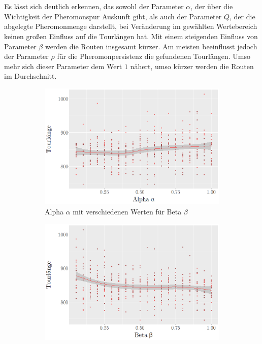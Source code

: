 \documentclass[doktyp=barbeit, sprache=german]{TUBAFarbeiten}
\begin{document}
\\\\Es lässt sich deutlich erkennen, das sowohl der Parameter $\alpha$, der über die Wichtigkeit der Pheromonspur Auskunft gibt, als auch der Parameter $Q$, der die abgelegte Pheromonmenge darstellt, bei Veränderung im gewählten Wertebereich keinen großen Einfluss auf die Tourlängen hat. Mit einem steigenden Einfluss von Parameter $\beta$ werden die Routen insgesamt kürzer. Am meisten beeinflusst jedoch der Parameter $\rho$ für die Pheromonpersistenz die gefundenen Tourlängen. Umso mehr sich dieser Parameter dem Wert $1$ nähert, umso kürzer werden die Routen im Durchschnitt.
\begin{figure}
        \centering
        \begin{subfigure}[b]{0.475\textwidth}
            \centering
            \includegraphics[width=\textwidth]{images/diagramiterativealpha}
            \caption{Alpha $\alpha$ mit verschiedenen Werten für Beta $\beta$}               
            \label{fig:iterativeAlpha}
        \end{subfigure}
        \hfill
        \begin{subfigure}[b]{0.475\textwidth}  
            \centering 
            \includegraphics[width=\textwidth]{images/diagramiterativebeta}

\end{subfigure}
\end{figure}
\end{document}
